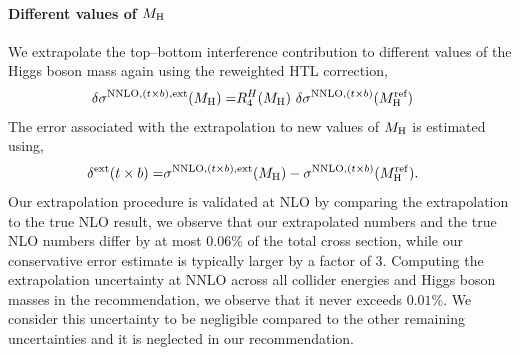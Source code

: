 \paragraph{Different values of $M_\mathrm{H}$}
We extrapolate the top--bottom interference contribution to different values of the Higgs boson mass again using the reweighted HTL correction, 
\begin{align}
\delta \sigma^{\mathrm{NNLO}, (t \times b), \text{ext}}(M_\mathrm{H}) = & R^H_4(M_\mathrm{H})\  \delta \sigma^{\mathrm{NNLO}, (t \times b)}(M_\mathrm{H}^\text{ref})
\end{align}
The error associated with the extrapolation to new values of $M_\mathrm{H}$ is estimated using,
\begin{align}
\delta^\text{ext}(t \times b) = & \sigma^{\mathrm{NNLO}, (t \times b), \text{ext}}(M_\mathrm{H}) - \sigma^{\mathrm{NNLO}, (t \times b)}(M_\mathrm{H}^\mathrm{ref}). 
\end{align}
Our extrapolation procedure is validated at NLO by comparing the extrapolation to the true NLO result, we observe that our extrapolated numbers and the true NLO numbers differ by at most $0.06\%$ of the total cross section, while our conservative error estimate is typically larger by a factor of 3.
Computing the extrapolation uncertainty at NNLO across all collider energies and Higgs boson masses in the recommendation, we observe that it never exceeds $0.01\%$.
We consider this uncertainty to be negligible compared to the other remaining uncertainties and it is neglected in our recommendation.

